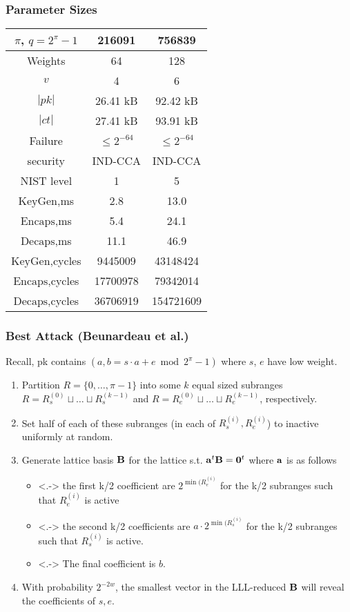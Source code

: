\documentclass[11pt,t,xcolor=pdftex,svgnames,handout]{beamer}
\begin{document}
\begin{frame}\frametitle{Parameter Sizes}
\onslide<+->
\begin{center}
\begin{table}
\small
\begin{tabular}{|c|c|c|}
\hline
$\pi$, $q=2^{\pi}-1$&216091&756839\\
\hline
Weights&64&128\\
$v$&4&6\\
\hline
$|pk|$&26.41 kB&92.42 kB\\
$|ct|$&27.41 kB&93.91 kB\\
\hline
Failure&$\leq 2^{-64}$&$\leq 2^{-64}$\\
\hline
security&IND-CCA&IND-CCA\\
NIST level&1&5\\
\hline
$\text{KeyGen}$,ms&2.8&13.0\\
$\text{Encaps}$,ms&5.4&24.1\\
$\text{Decaps}$,ms&11.1&46.9\\
\hline
$\text{KeyGen}$,cycles&9445009&43148424\\
$\text{Encaps}$,cycles&17700978&79342014\\
$\text{Decaps}$,cycles&36706919&154721609\\
\hline
\end{tabular}
\end{table}
\end{center}
\end{frame}

\begin{frame}\frametitle{Best Attack (Beunardeau et al.)}
\onslide<+->
Recall, pk contains $(a,b=s\cdot a + e \bmod{2^{\pi}-1})$ where
$s$, $e$ have low weight.
\begin{enumerate}
\item<+-> Partition $R=\{0,\ldots,\pi-1\}$ into some $k$ equal sized
  subranges\\ \smallskip $R=R_{s}^{(0)} \sqcup \ldots \sqcup R_{s}^{(k-1)}$ and
  $R=R_{e}^{(0)} \sqcup \ldots \sqcup R_{e}^{(k-1)}$, respectively. 
\smallskip
\item<+->  Set half of each of these subranges (in each of $R_s^{(i)},
  R_{e}^{(i)}$) to \alert{inactive} uniformly at random.
\smallskip
\item<+-> Generate lattice basis $\mathbf{B}$ for the lattice
  s.t. $\mathbf{a}^t\mathbf{B}=\mathbf{0}^t$ where $\mathbf{a}$ is as follows
\begin{itemize}
\item<.-> the first k/2 coefficient
  are $2^{\min(R_{e}^{(i)}}$ for the k/2 subranges such that $R_{e}^{(i)}$
  is \alert{active}
\item<.-> the second k/2 coefficients are $a \cdot 2^{\min(R_{s}^{(i)}}$
  for the k/2 subranges such that $R_{s}^{(i)}$ is \alert{active}.
\item<.-> The final coefficient is $b$.
\end{itemize}
\item<+-> With probability $2^{-2w}$, the smallest vector in the
  LLL-reduced $\mathbf{B}$ will reveal the coefficients of $s,e$. 
\smallskip
\end{enumerate}
\end{frame}
\end{document}
